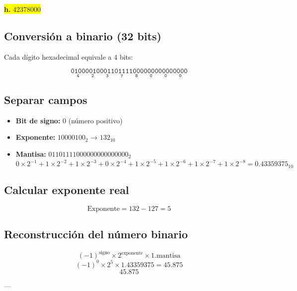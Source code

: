 \documentclass[a4paper,12pt]{article}
\begin{document}
	\begin{center}
		\colorbox{yellow}{\textbf{h.} 42378000}
		\subsection*{Conversión a binario (32 bits)}
		Cada dígito hexadecimal equivale a 4 bits:
		
		\[
		\mathtt{
			\underset{\text{4}}{\boxed{\mathtt{0100}}}
			\underset{\text{2}}{\boxed{\mathtt{0010}}}
			\underset{\text{3}}{\boxed{\mathtt{0011}}}
			\underset{\text{7}}{\boxed{\mathtt{0111}}}
			\underset{\text{8}}{\boxed{\mathtt{1000}}}
			\underset{\text{0}}{\boxed{\mathtt{0000}}}
			\underset{\text{0}}{\boxed{\mathtt{0000}}}
			\underset{\text{0}}{\boxed{\mathtt{0000}}}
		}	
		\]
		
		\subsection*{Separar campos}
		
		\begin{itemize}
			\item \textbf{Bit de signo:} 0 (número positivo)
			\item \textbf{Exponente:} $10000100_2$ → $132_{10}$
			\item \textbf{Mantisa:} $01101111000000000000000_2$ 
			\[
			0\times2^{-1} + 1\times2^{-2} + 1\times2^{-3} + 0\times2^{-4} + 1\times2^{-5} + 1\times2^{-6} + 1\times2^{-7} + 1\times2^{-8}= 0.43359375_{10}
			\]
		\end{itemize}
		
		\subsection*{Calcular exponente real}
		
		\[
		\text{Exponente} = 132 -127 = 5
		\]
		
		
		
		\subsection*{Reconstrucción del número binario}	
		\[
		(-1)^{\text{signo}} \times 2^{\text{exponente}} \times 1.\text{mantisa}
		\]
		\[
		(-1)^0 \times 2^5 \times 1.43359375 = 45.875
		\]
		\vspace{1em}
		\[
		\boxed{45.875}
		\]
		
		---
	\end{center}
\end{document}
